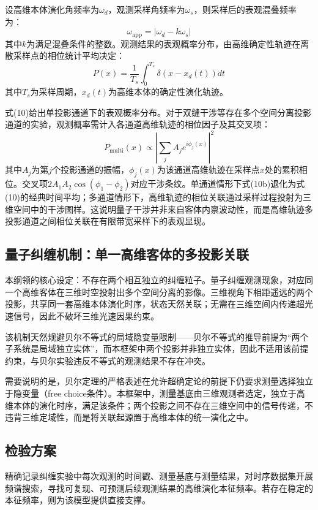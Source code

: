 \documentclass[12pt,a4paper]{ctexart}
\begin{document}
设高维本体演化角频率为$\omega_d$，观测采样角频率为$\omega_s$，则采样后的表观混叠频率为：
\begin{equation}
\omega_{\text{app}} = |\omega_d - k\omega_s|
\end{equation}
其中$k$为满足混叠条件的整数。观测结果的表观概率分布，由高维确定性轨迹在离散采样点的相位统计平均决定：
\begin{equation}
P(x) = \frac{1}{T_s} \int_0^{T_s} \delta(x - x_d(t)) dt
\end{equation}
其中$T_s$为采样周期，$x_d(t)$为高维本体的确定性演化轨迹。

式(10)给出单投影通道下的表观概率分布。对于双缝干涉等存在多个空间分离投影通道的实验，观测概率需计入各通道高维轨迹的相位因子及其交叉项：
\begin{equation*}
P_{\text{multi}}(x) \propto \left| \sum_{j} A_j e^{i \phi_j(x)} \right|^2
\tag{10b}
\end{equation*}
其中$A_j$为第$j$个投影通道的振幅，$\phi_j(x)$为该通道高维轨迹在采样点$x$处的累积相位。交叉项$2A_1 A_2 \cos(\phi_1 - \phi_2)$对应干涉条纹。单通道情形下式(10b)退化为式(10)的经典时间平均；多通道情形下，高维轨迹的相位关联通过采样过程投射为三维空间中的干涉图样。这说明量子干涉并非来自客体内禀波动性，而是高维轨迹多投影通道之间相位关联在有限带宽采样下的表观显现\cite{feynman1963, wheeler1983}。

\subsection{量子纠缠机制：单一高维客体的多投影关联}
本纲领的核心设定：不存在两个相互独立的纠缠粒子。量子纠缠观测现象，对应同一个高维客体在三维时空投射出多个空间分离的影像。三维视角下相距遥远的两个投影，共享同一套高维本体演化时序，状态天然关联；无需在三维空间内传递超光速信号，因此不破坏三维光速因果约束。

该机制天然规避贝尔不等式的局域隐变量限制——贝尔不等式的推导前提为“两个子系统是局域独立实体”，而本框架中两个投影并非独立实体，因此不适用该前提约束，与贝尔实验违反不等式的观测结果不存在冲突\cite{bell1964, aspect1982}。

需要说明的是，贝尔定理的严格表述在允许超确定论的前提下仍要求测量选择独立于隐变量（free choice条件）。本框架中，测量基底由三维观测者选定，独立于高维本体的演化时序，满足该条件；两个投影之间不存在三维空间中的信号传递，不违背三维定域性，而是将关联起源置于高维本体的统一演化之中\cite{brassard2000, gill2014}。

\subsection{检验方案}
精确记录纠缠实验中每次观测的时间戳、测量基底与测量结果，对时序数据集开展频谱搜索，寻找可复现、可预测后续观测结果的高维演化本征频率。若存在稳定的本征频率，则为该模型提供直接支撑。
\end{document}
